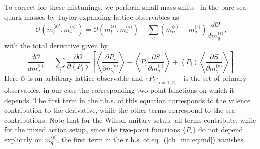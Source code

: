 To correct for these mistunings, we perform small mass shifts~\cite{BKS} in the bare sea quark masses by Taylor expanding lattice observables as
\begin{equation}
\label{ch_ma:eq:mass_shift}
\mathcal{O}\left(m_l^{\textrm{(s)'}},m_s^{\textrm{(s)'}}\right)=\mathcal{O}\left(m_l^{\textrm{(s)}},m_s^{\textrm{(s)}}\right)+\sum_q\left(m_q^{\textrm{(s)'}}-m_q^{\textrm{(s)}}\right)\frac{d\mathcal{O}}{dm_q^{\textrm{(s)}}},
\end{equation}
with the total derivative given by
\begin{equation}
\label{ch_ma:eq:md}
\frac{d\mathcal{O}}{dm_q^{\textrm{(s)}}}=\sum_i\frac{\partial\mathcal{O}}{\partial \left<P_i\right>}\left[\left<\frac{\partial P_i}{\partial m_q^{\textrm{(s)}}}\right>-\left<P_i\frac{\partial S}{\partial m_q^{\textrm{(s)}}}\right>+\left<P_i\right>\left<\frac{\partial S}{\partial m_q^{\textrm{(s)}}}\right>\right].
\end{equation}
Here $\mathcal{O}$ is an arbitrary lattice observable and $\{P_i\}_{i=1,2,...}$ is the set of primary observables, in our case the corresponding two-point functions on which it depends. The first term in the r.h.s. of this equation corresponds to the valence contribution to the derivative, while the other terms correspond to the sea contributions. Note that for the Wilson unitary setup, all terms contribute, while for the mixed action setup, since the two-point functions $\{P_i\}$ do not depend explicitly on $m_q^{\textrm{(s)}}$, the first term in the r.h.s. of eq.~(\ref{ch_ma:eq:md}) vanishes.

